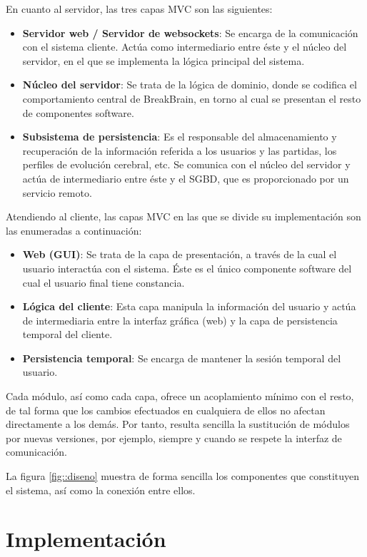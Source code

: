 En cuanto al servidor, las tres capas MVC son las siguientes:

\begin{itemize}
\item {\bf Servidor web / Servidor de websockets}: Se encarga de la comunicación con el sistema cliente. Actúa como intermediario entre éste y el núcleo del servidor, en el que se implementa la lógica principal del sistema.
\item {\bf Núcleo del servidor}: Se trata de la lógica de dominio, donde se codifica el comportamiento central de BreakBrain, en torno al cual se presentan el resto de componentes software.
\item {\bf Subsistema de persistencia}: Es el responsable del almacenamiento y recuperación de la información referida a los usuarios y las partidas, los perfiles de evolución cerebral, etc. Se comunica con el núcleo del servidor y actúa de intermediario entre éste y el \acf{SGBD}, que es proporcionado por un servicio remoto.
\end{itemize}

Atendiendo al cliente, las capas MVC en las que se divide su implementación son las enumeradas a continuación:

\begin{itemize}
\item {\bf Web (GUI)}: Se trata de la capa de presentación, a través de la cual el usuario interactúa con el sistema. Éste es el único componente software del cual el usuario final tiene constancia.
\item {\bf Lógica del cliente}: Esta capa manipula la información del usuario y actúa de intermediaria entre la interfaz gráfica (web) y la capa de persistencia temporal del cliente.
\item {\bf Persistencia temporal}: Se encarga de mantener la sesión temporal del usuario.
\end{itemize}

Cada módulo, así como cada capa, ofrece un acoplamiento mínimo con el resto, de tal forma que los cambios efectuados en cualquiera de ellos no afectan directamente a los demás. Por tanto, resulta sencilla la sustitución de módulos por nuevas versiones, por ejemplo, siempre y cuando se respete la interfaz de comunicación.

La figura \ref{fig::diseno} muestra de forma sencilla los componentes que constituyen el sistema, así como la conexión entre ellos. 

\section{Implementación}
\label{sec::implementacion}


